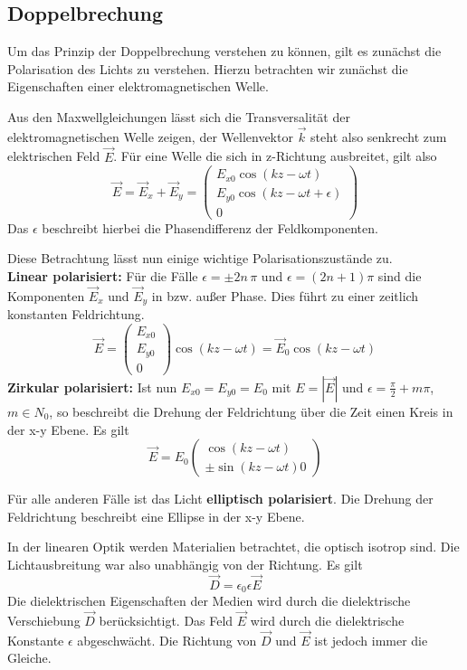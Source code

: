     \subsection{Doppelbrechung}

Um das Prinzip der Doppelbrechung verstehen zu können, gilt es zunächst die 
Polarisation des Lichts zu verstehen. Hierzu betrachten wir zunächst die 
Eigenschaften einer elektromagnetischen Welle.\par
Aus den Maxwellgleichungen lässt sich die Transversalität der elektromagnetischen
Welle zeigen, der Wellenvektor $\vec{k}$ steht also senkrecht zum elektrischen 
Feld $\vec{E}$. Für eine Welle die sich in z-Richtung ausbreitet, gilt also
\[
    \vec{E} = \vec{E}_x + \vec{E}_y = 
      \begin{pmatrix}
          E_{x0} \cos(kz-\omega t)\\
          E_{y0} \cos(kz-\omega t + \epsilon)\\
          0
      \end{pmatrix}
\]
Das $\epsilon$ beschreibt hierbei die Phasendifferenz der Feldkomponenten.

Diese Betrachtung lässt nun einige wichtige Polarisationszustände zu.\\
\textbf{Linear polarisiert:} Für die Fälle $\epsilon = \pm 2n \, \pi$ und
$\epsilon = (2n+1) \pi$ sind die Komponenten $\vec{E}_x$ und $\vec{E}_y$ in bzw.
außer Phase. Dies führt zu einer zeitlich konstanten Feldrichtung.
\[
    \vec{E} = 
      \begin{pmatrix}
          E_{x0}\\
          E_{y0}\\
          0
      \end{pmatrix}
    \cos (kz-\omega t) = \vec{E}_0 \cos (kz-\omega t)
\]
\textbf{Zirkular polarisiert:} Ist nun $E_{x0} = E_{y0} = E_0$ mit 
$E = | \vec{E} |$ und $\epsilon = \frac{\pi}{2} + m \pi$, $m \in N_0$, so beschreibt
die Drehung der Feldrichtung über die Zeit einen Kreis in der x-y Ebene. Es gilt
\[
    \vec{E} = E_0
        \begin{pmatrix}
            \cos(kz-\omega t)\\
            \pm \sin(kz-\omega t)
            0
        \end{pmatrix}
\]

Für alle anderen Fälle ist das Licht \textbf{elliptisch polarisiert}. Die 
Drehung der Feldrichtung beschreibt eine Ellipse in der x-y Ebene.

In der linearen Optik werden Materialien betrachtet, die optisch isotrop sind.
Die Lichtausbreitung war also unabhängig von der Richtung. Es gilt
\[
    \vec{D} = \epsilon_0 \epsilon \vec{E}
\]
Die dielektrischen Eigenschaften der Medien wird durch die dielektrische
Verschiebung $\vec{D}$ berücksichtigt. Das Feld $\vec{E}$ wird durch
die dielektrische Konstante $\epsilon$ abgeschwächt. Die Richtung von 
$\vec{D}$ und $\vec{E}$ ist jedoch immer die Gleiche. 

